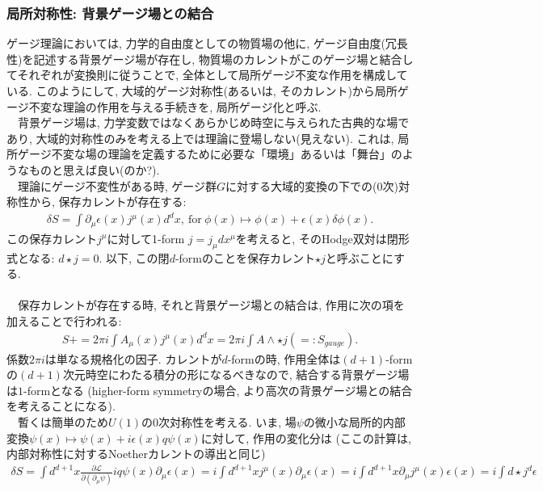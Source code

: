 \subsubsection{局所対称性: 背景ゲージ場との結合}
ゲージ理論においては, 力学的自由度としての物質場の他に, ゲージ自由度(冗長性)を記述する背景ゲージ場が存在し, 
物質場のカレントがこのゲージ場と結合してそれぞれが変換則に従うことで, 全体として局所ゲージ不変な作用を構成している. 
このようにして, 大域的ゲージ対称性(あるいは, そのカレント)から局所ゲージ不変な理論の作用を与える手続きを, 局所ゲージ化と呼ぶ. \\
　背景ゲージ場は, 力学変数ではなくあらかじめ時空に与えられた古典的な場であり, 
大域的対称性のみを考える上では理論に登場しない(見えない). 
これは, 局所ゲージ不変な場の理論を定義するために必要な「環境」あるいは「舞台」のようなものと思えば良い(のか?). \\
　理論にゲージ不変性がある時, ゲージ群$G$に対する大域的変換の下での($0$次)対称性から, 保存カレントが存在する: 
\begin{align}
    \delta S = \int \partial_\mu \epsilon(x)j^\mu (x)d^dx, ~ 
    \mathrm{for}~ \phi(x)\mapsto \phi(x)+ \epsilon(x)\delta \phi(x). 
\end{align}
この保存カレント$j^{\mu}$に対して1-form $j=j_{\mu}dx^{\mu}$を考えると, 
そのHodge双対は閉形式となる: $d\star j=0$. 
以下, この閉$d$-formのことを保存カレント$\star j$と呼ぶことにする. \\\\
　保存カレントが存在する時, それと背景ゲージ場との結合は, 作用に次の項を加えることで行われる: 
\begin{align}
    S + = 2\pi i\int A_{\mu}(x)j^\mu(x)d^d x = 2\pi i\int A\wedge \star j (=: S_{gauge}). 
\end{align}
係数$2\pi i$は単なる規格化の因子. 
カレントが$d$-formの時, 作用全体は$(d+1)$-formの$(d+1)$次元時空にわたる積分の形になるべきなので, 結合する背景ゲージ場は$1$-formとなる
(higher-form symmetryの場合, より高次の背景ゲージ場との結合を考えることになる). \\
　暫くは簡単のため$U(1)$の$0$次対称性を考える. いま, 場$\psi$の微小な局所的内部変換$\psi(x)\mapsto \psi(x) + i\epsilon(x)q\psi(x)$に対して, 作用の変化分は
(ここの計算は, 内部対称性に対するNoetherカレントの導出と同じ)
\begin{align}
    \delta S = \int d^{d+1}x \frac{\partial \mathcal{L}}{\partial(\partial_\mu \psi)}iq\psi(x)\partial_\mu\epsilon(x)
    =i\int d^{d+1}x j^\mu(x)\partial_\mu \epsilon(x)
    =i\int d^{d+1}x \partial_\mu j^{\mu}(x) \epsilon(x)
    =i\int d\star j^{d} \epsilon
\end{align}
